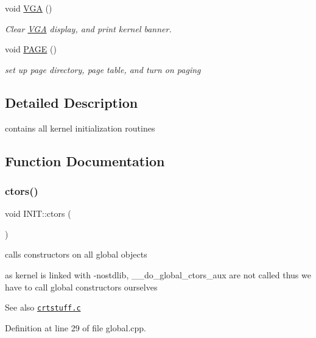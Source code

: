 \begin{DoxyCompactItemize}
void \hyperlink{namespace_i_n_i_t_abae5789d80f8edd37455f3b167779654}{V\+GA} ()
\begin{DoxyCompactList}\small\item\em Clear \hyperlink{namespace_v_g_a}{V\+GA} display, and print kernel banner. \end{DoxyCompactList}\item 
void \hyperlink{namespace_i_n_i_t_aea383d3de30095cf9d176fa60b66d01d}{P\+A\+GE} ()
\begin{DoxyCompactList}\small\item\em set up page directory, page table, and turn on paging \end{DoxyCompactList}\end{DoxyCompactItemize}


\subsection{Detailed Description}
contains all kernel initialization routines 

\subsection{Function Documentation}
\mbox{\label{namespace_i_n_i_t_a6608557e41ad37cdb4a408e2f05c9783}} 
\subsubsection{\texorpdfstring{ctors()}{ctors()}}
{\footnotesize\ttfamily void I\+N\+I\+T\+::ctors (\begin{DoxyParamCaption}{ }\end{DoxyParamCaption})}



calls constructors on all global objects 

as kernel is linked with -\/nostdlib, \+\_\+\+\_\+do\+\_\+global\+\_\+ctors\+\_\+aux are not called thus we have to call global constructors ourselves

\begin{DoxySeeAlso}{See also}
\href{https://github.com/gcc-mirror/gcc/blob/master/libgcc/crtstuff.c}{\tt crtstuff.\+c} 
\end{DoxySeeAlso}


Definition at line 29 of file global.\+cpp.

\mbox{\label{namespace_i_n_i_t_a3462d7bc51bce77cc240d05b62b1b777}} 
